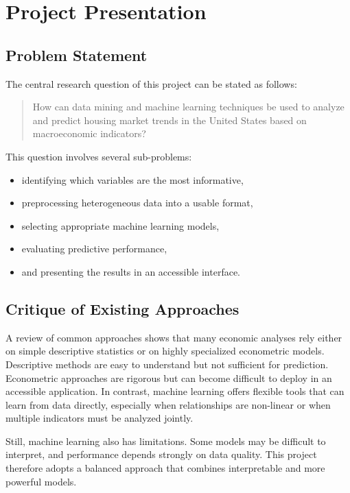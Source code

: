 \section{Project Presentation}

\subsection{Problem Statement}

The central research question of this project can be stated as follows:

\begin{quote}
How can data mining and machine learning techniques be used to analyze and predict housing market trends in the United States based on macroeconomic indicators?
\end{quote}

This question involves several sub-problems:
\begin{itemize}
\item identifying which variables are the most informative,
\item preprocessing heterogeneous data into a usable format,
\item selecting appropriate machine learning models,
\item evaluating predictive performance,
\item and presenting the results in an accessible interface.
\end{itemize}

\subsection{Critique of Existing Approaches}

A review of common approaches shows that many economic analyses rely either on simple descriptive statistics or on highly specialized econometric models.
Descriptive methods are easy to understand but not sufficient for prediction.
Econometric approaches are rigorous but can become difficult to deploy in an accessible application.
In contrast, machine learning offers flexible tools that can learn from data directly, especially when relationships are non-linear or when multiple indicators must be analyzed jointly.

Still, machine learning also has limitations.
Some models may be difficult to interpret, and performance depends strongly on data quality.
This project therefore adopts a balanced approach that combines interpretable and more powerful models.

